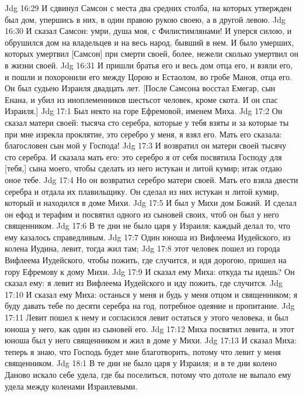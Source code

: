 \vs Jdg 16:29 И сдвинул Самсон с места два средних столба, на которых утвержден был дом, упершись в них, в один правою рукою своею, а в другой левою.
\vs Jdg 16:30 И сказал Самсон: умри, душа моя, с Филистимлянами! И уперся  силою, и обрушился дом на владельцев и на весь народ, бывший в нем. И было умерших, которых умертвил [Самсон] при смерти своей, более, нежели сколько умертвил он в жизни своей.
\vs Jdg 16:31 И пришли братья его и весь дом отца его, и взяли его, и пошли и похоронили его между Цорою и Естаолом, во гробе Маноя, отца его. Он был судьею Израиля двадцать лет. [После Самсона восстал Емегар, сын Енана, и убил из иноплеменников шестьсот человек, кроме скота. И он спас Израиля.]
\vs Jdg 17:1 Был некто на горе Ефремовой, именем Миха.
\vs Jdg 17:2 Он сказал матери своей: тысяча сто  серебра, которые у тебя взяты и за которые ты при мне изрекла проклятие, это серебро у меня, я взял его. Мать его сказала: благословен сын мой у Господа!
\vs Jdg 17:3 И возвратил он матери своей тысячу сто  серебра. И сказала мать его: это серебро я от себя посвятила Господу для [тебя,] сына моего, чтобы сделать из него истукан и литой кумир; итак отдаю оное тебе.
\vs Jdg 17:4 Но он возвратил серебро матери своей. Мать его взяла двести  серебра и отдала их плавильщику. Он сделал из них истукан и литой кумир, который и находился в доме Михи.
\vs Jdg 17:5 И был у Михи дом Божий. И сделал он ефод и терафим и посвятил одного из сыновей своих, чтоб он был у него священником.
\rsbpar\vs Jdg 17:6 В те дни не было царя у Израиля; каждый делал то, что ему казалось справедливым.
\vs Jdg 17:7 Один юноша из Вифлеема Иудейского, из колена Иудина, левит, тогда жил там;
\vs Jdg 17:8 этот человек пошел из города Вифлеема Иудейского, чтобы пожить, где случится, и идя дорогою, пришел на гору Ефремову к дому Михи.
\vs Jdg 17:9 И сказал ему Миха: откуда ты идешь? Он сказал ему: я левит из Вифлеема Иудейского и иду пожить, где случится.
\vs Jdg 17:10 И сказал ему Миха: останься у меня и будь у меня отцом и священником; я буду давать тебе по десяти  серебра на год, потребное одеяние и пропитание.
\vs Jdg 17:11 Левит пошел к нему и согласился левит остаться у этого человека, и был юноша у него, как один из сыновей его.
\vs Jdg 17:12 Миха посвятил левита, и этот юноша был у него священником и жил в доме у Михи.
\vs Jdg 17:13 И сказал Миха: теперь я знаю, что Господь будет мне благотворить, потому что левит у меня священником.
\vs Jdg 18:1 В те дни не было царя у Израиля; и в те дни колено Даново искало себе удела, где бы поселиться, потому что дотоле не выпало ему  удела между коленами Израилевыми.
